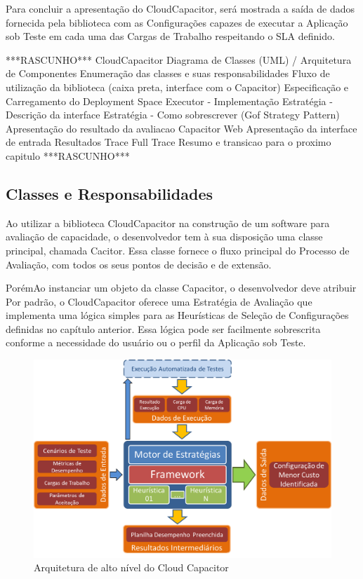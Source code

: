 Para concluir a apresentação do CloudCapacitor, será mostrada a saída de dados
fornecida pela biblioteca com as Configurações capazes de executar a
Aplicação sob Teste em cada uma das Cargas de Trabalho respeitando o SLA definido.

***RASCUNHO***
CloudCapacitor
  Diagrama de Classes (UML) / Arquitetura de Componentes
  Enumeração das classes e suas responsabilidades
  Fluxo de utilização da biblioteca (caixa preta, interface com o Capacitor)
  Especificação e Carregamento do Deployment Space
  Executor - Implementação
  Estratégia - Descrição da interface
  Estratégia - Como sobrescrever (Gof Strategy Pattern)
  Apresentação do resultado da avaliacao
Capacitor Web
  Apresentação da interface de entrada
  Resultados
  Trace
  Full Trace
Resumo e transicao para o proximo capitulo
***RASCUNHO***

\subsection{Classes e Responsabilidades}
\label{subsec:classes}
Ao utilizar a biblioteca CloudCapacitor na construção de um software para avaliação
de capacidade, o desenvolvedor tem à sua disposição uma classe principal, chamada
Cacitor. Essa classe fornece o fluxo principal do Processo de Avaliação, com todos
os seus pontos de decisão e de extensão.

PorémAo instanciar um objeto da classe Capacitor, o desenvolvedor deve atribuir  
Por padrão, o CloudCapacitor oferece uma Estratégia de Avaliação que implementa 
uma lógica simples para as Heurísticas de Seleção de Configurações definidas no
capítulo anterior. Essa lógica pode ser facilmente sobrescrita conforme a necessidade
do usuário ou o perfil da Aplicação sob Teste.

\begin{figure}[htb]
  \caption{\label{fig_arq_alto_nivel}Arquitetura de alto nível do Cloud Capacitor}
  \begin{center}
    \includegraphics[scale=0.5]{img/arquiteturaAltoNivel}
  \end{center}
\end{figure}

